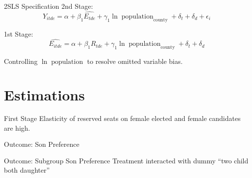 \documentclass[
  9pt,
  ignorenonframetext,
  aspectratio=43,
]{beamer}
\begin{document}
\begin{frame}{2SLS Specification}
\protect\hypertarget{sls-specification}{}
2nd Stage: \[
Y_{itde} = \alpha + \beta_1 \hat{E_{tde}} + \gamma_1 \ln \operatorname{population}_{\text{county}} + \delta_t + \delta_{d} + \epsilon_i
\]

1st Stage: \[
\hat{E_{itde}} = \alpha + \beta_1 R_{tde}  + \gamma_1 \ln \operatorname{population}_{\text{county}} + \delta_t + \delta_{d}
\]

Controlling \(\ln \operatorname{population}\) to resolve omitted
variable bias.
\end{frame}

\hypertarget{estimations}{%
\section{Estimations}\label{estimations}}

\begin{frame}{First Stage}
\protect\hypertarget{first-stage}{}
Elasticity of reserved seats on female elected and female candidates are
high.


\end{frame}

\begin{frame}{Outcome: Son Preference}
\protect\hypertarget{outcome-son-preference}{}

\end{frame}

\begin{frame}{Outcome: Subgroup Son Preference}
\protect\hypertarget{outcome-subgroup-son-preference}{}
Treatment interacted with dummy ``two child both daughter''


\end{frame}
\end{document}
